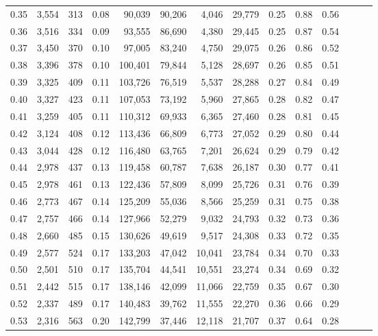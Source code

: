 \begin{tabular}{rrrrrrrrrrrrrr}
0.35 &  3,554 &  313 &  0.08 &   90,039 &   90,206 &   4,046 &  29,779 &  0.25 &  0.88 &      0.56 \\
0.36 &  3,516 &  334 &  0.09 &   93,555 &   86,690 &   4,380 &  29,445 &  0.25 &  0.87 &      0.54 \\
0.37 &  3,450 &  370 &  0.10 &   97,005 &   83,240 &   4,750 &  29,075 &  0.26 &  0.86 &      0.52 \\
0.38 &  3,396 &  378 &  0.10 &  100,401 &   79,844 &   5,128 &  28,697 &  0.26 &  0.85 &      0.51 \\
0.39 &  3,325 &  409 &  0.11 &  103,726 &   76,519 &   5,537 &  28,288 &  0.27 &  0.84 &      0.49 \\
0.40 &  3,327 &  423 &  0.11 &  107,053 &   73,192 &   5,960 &  27,865 &  0.28 &  0.82 &      0.47 \\
0.41 &  3,259 &  405 &  0.11 &  110,312 &   69,933 &   6,365 &  27,460 &  0.28 &  0.81 &      0.45 \\
0.42 &  3,124 &  408 &  0.12 &  113,436 &   66,809 &   6,773 &  27,052 &  0.29 &  0.80 &      0.44 \\
0.43 &  3,044 &  428 &  0.12 &  116,480 &   63,765 &   7,201 &  26,624 &  0.29 &  0.79 &      0.42 \\
0.44 &  2,978 &  437 &  0.13 &  119,458 &   60,787 &   7,638 &  26,187 &  0.30 &  0.77 &      0.41 \\
0.45 &  2,978 &  461 &  0.13 &  122,436 &   57,809 &   8,099 &  25,726 &  0.31 &  0.76 &      0.39 \\
0.46 &  2,773 &  467 &  0.14 &  125,209 &   55,036 &   8,566 &  25,259 &  0.31 &  0.75 &      0.38 \\
0.47 &  2,757 &  466 &  0.14 &  127,966 &   52,279 &   9,032 &  24,793 &  0.32 &  0.73 &      0.36 \\
0.48 &  2,660 &  485 &  0.15 &  130,626 &   49,619 &   9,517 &  24,308 &  0.33 &  0.72 &      0.35 \\
0.49 &  2,577 &  524 &  0.17 &  133,203 &   47,042 &  10,041 &  23,784 &  0.34 &  0.70 &      0.33 \\
0.50 &  2,501 &  510 &  0.17 &  135,704 &   44,541 &  10,551 &  23,274 &  0.34 &  0.69 &      0.32 \\
0.51 &  2,442 &  515 &  0.17 &  138,146 &   42,099 &  11,066 &  22,759 &  0.35 &  0.67 &      0.30 \\
0.52 &  2,337 &  489 &  0.17 &  140,483 &   39,762 &  11,555 &  22,270 &  0.36 &  0.66 &      0.29 \\
0.53 &  2,316 &  563 &  0.20 &  142,799 &   37,446 &  12,118 &  21,707 &  0.37 &  0.64 &      0.28 \\

\end{tabular}

